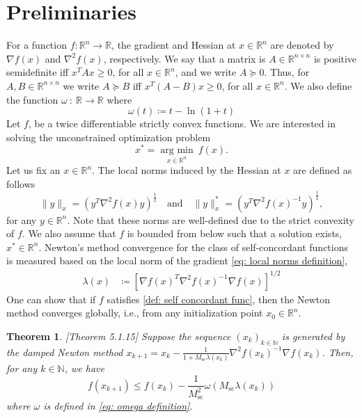 \documentclass[sn-mathphys-num]{sn-jnl}%
\newcommand{\R}{\mathbb{R}}
\newcommand{\N}{\mathbb{N}}
\theoremstyle{thmstyleone}%
\newtheorem{theorem}{Theorem}[section]%
\theoremstyle{thmstyletwo}%
\theoremstyle{thmstylethree}%
\numberwithin{equation}{section}
\begin{document}
\section{Preliminaries}
For a function $f : \R^n \rightarrow \R$, the gradient and Hessian at $x \in \R^n$ are denoted by $\nabla f(x)$ and $\nabla^2 f(x)$, respectively.
We say that a matrix is $A \in \R^{n \times n}$ is positive semidefinite iff $x^T A x \geq 0 $, for all $x \in \R^n$, and we write $A \succeq 0$. Thus, for $A, B \in \R^{n \times n}$ we write $A \succeq B$ iff $x^T \left(A - B\right) x \geq 0 $, for all $x \in \R^n$. We also define the function $\omega \ : \ \R \to \R$ where
\begin{equation} \label{eq: omega definition}
    \omega(t) \coloneq t - \ln({1+t})
\end{equation}
Let $f$, be a twice differentiable strictly convex functions. We are interested in solving the unconstrained optimization problem
\begin{equation*}
    x^* = \underset{x \in \R^n}{\operatorname{arg \  min}}  \ f(x).
\end{equation*}
Let us fix an $x \in \R^n$. The local norms induced by the Hessian at $x$ are defined as follows
\begin{equation} \label{eq: local norms definition}
    \| y \|_x = \left( y^T \nabla^2f(x) y \right)^{\frac{1}{2}} \quad \text{and}  \quad  \| y \|_x^* = \left( y^T \nabla^2f(x)^{-1} y \right)^{\frac{1}{2}},
\end{equation}
for any $y \in \R^n$. Note that these norms are well-defined due to the strict convexity of $f$.
We also assume that $f$ is bounded from below such that a solution exists, $x^* \in \R^n$. Newton's method convergence for the class of self-concordant functions is measured based on the local norm of the gradient \eqref{eq: local norms definition}, 
\begin{align}
    \lambda(x) & \coloneq \left[\nabla f(x)^T \nabla^2 f(x)^{-1} \nabla f(x)\right]^{1/2} \label{eq: newton decrement}
\end{align}
One can show that if $f$ satisfies \eqref{def: self concordant func}, then the Newton method converges globally, i.e., from any initialization point $x_0 \in \R^n$. 
\begin{theorem} \cite{nesterov2018lectures}[Theorem 5.1.15] \label{thm: newton first phase self concor}
Suppose the sequence $(x_k)_{k \in \N}$ is generated by the damped Newton method $ x_{k+1} = x_k - \frac{1}{1 + M_\text{sc} \lambda(x_k)} \nabla^2 f (x_k)^{-1} \nabla f (x_k)$. Then, for any $k \in \N$, we have
\begin{equation} \label{ineq: newton first phase self concor}
    f(x_{k+1}) \leq f(x_{k}) - \frac{1}{M_\text{sc}^2} \omega(M_\text{sc} \lambda(x_k))
\end{equation}
where $\omega$ is defined in \eqref{eq: omega definition}.
\end{theorem}
\end{document}
